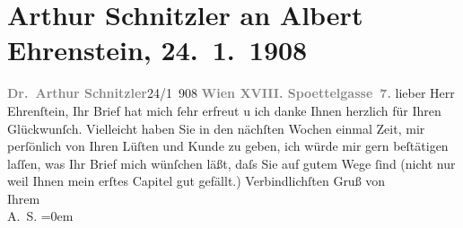 

         
         \renewcommand{\erwaehntePersonen}{Personen: Albert Ehrenstein}
         \renewcommand{\erwaehnteOrte}{Orte: Edmund-Weiß-Gasse, Wien}
         \renewcommand{\erwaehnteWerke}{Werke: Der Weg ins Freie. Roman}
               \section[Arthur Schnitzler an Albert Ehrenstein, 24. 1. 1908]{ Arthur Schnitzler an Albert Ehrenstein, 24. 1. 1908}\nopagebreak{}\rehead{ }\begin{ledgroupsized}[t]{13cm}\normalsize\beginnumbering \toendnotes[C]{\smallbreak\pagebreak[2]} 
\toendnotes[C]{\smallbreak}\pstart
           \noindent{}{\pb}\textcolor{gray}{\textbf{Dr. Arthur Schnitzler}}\hfill 24/1 908\pend
           \pstart
           \textcolor{gray}{\textbf{Wien XVIII. Spoettelgasse 7.}}\pend
           \pstart
           lieber Herr Ehrenſtein, Ihr Brief hat mich ſehr erfreut u ich danke
               Ihnen herzlich für Ihren Glückwunſch. Vielleicht haben Sie in den nächſten Wochen
               einmal Zeit, mir perſönlich von Ihren Lüſten und \label{T_L01757_1v}\label{T_L01757_1h} Kunde zu geben, ich würde mir
               gern beſtätigen {\pb}laſſen, was Ihr Brief mich wünſchen läßt, daſs
               Sie auf gutem Wege ſind (nicht nur weil Ihnen mein erſtes Capitel gut gefällt.)\pend
           \pstart
           Verbindlichſten Gruß von{\\[\baselineskip]} Ihrem{\\[\baselineskip]}\spacefill\mbox{A. S.}\pend
           \leftskip=0em{}
         
         \endnumbering{}\end{ledgroupsized}  \newcommand{\dateiname}{L01757}\newcommand{\titel}{Arthur Schnitzler an Albert Ehrenstein, 24. 1. 1908}\newcommand{\editorInnen}{Martin Anton Müller und Gerd-Hermann Susen}
      